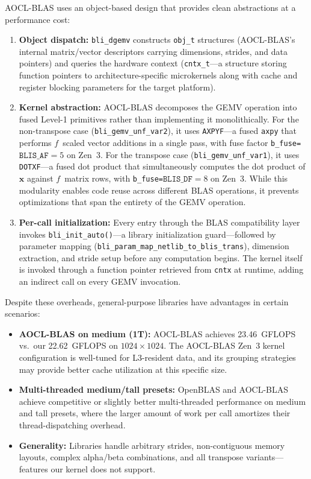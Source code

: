 \documentclass[runningheads]{llncs}
\begin{document}
\label{sec:blis}
AOCL-BLAS uses an object-based design that provides clean abstractions at a
performance cost:

\begin{enumerate}
\item \textbf{Object dispatch:} \texttt{bli\_dgemv} constructs \texttt{obj\_t}
      structures (AOCL-BLAS's internal matrix/vector descriptors carrying dimensions,
      strides, and data pointers) and queries the hardware context
      (\texttt{cntx\_t}---a structure storing function pointers to
      architecture-specific microkernels along with cache and register blocking
      parameters for the target platform).
\item \textbf{Kernel abstraction:} AOCL-BLAS decomposes the GEMV operation into
      fused Level-1 primitives rather than implementing it monolithically.
      For the non-transpose case (\texttt{bli\_gemv\_unf\_var2}), it uses
      \texttt{AXPYF}---a fused \texttt{axpy} that performs $f$~scaled
      vector additions in a single pass, with fuse factor
      \texttt{b\_fuse=}$\texttt{BLIS\_AF}=5$ on Zen~3.
      For the transpose case (\texttt{bli\_gemv\_unf\_var1}), it uses
      \texttt{DOTXF}---a fused dot product that simultaneously computes
      the dot product of $\mathbf{x}$ against $f$~matrix rows, with
      \texttt{b\_fuse=}$\texttt{BLIS\_DF}=8$ on Zen~3.
      While this modularity enables code reuse across different BLAS operations,
      it prevents optimizations that span the entirety of the GEMV operation.
\item \textbf{Per-call initialization:} Every entry through the BLAS
      compatibility layer invokes \texttt{bli\_init\_auto()}---a library
      initialization guard---followed by parameter mapping
      (\texttt{bli\_param\_map\_netlib\_to\_blis\_trans}), dimension
      extraction, and stride setup before any computation begins. The
      kernel itself is invoked through a function pointer retrieved from
      \texttt{cntx} at runtime, adding an indirect call on every GEMV
      invocation.
\end{enumerate}

Despite these overheads, general-purpose libraries have advantages in certain
scenarios:

\begin{itemize}
\item \textbf{AOCL-BLAS on medium (1T):} AOCL-BLAS achieves 23.46~GFLOPS vs.\ our
      22.62~GFLOPS on $1024 \times 1024$. The AOCL-BLAS Zen~3 kernel configuration
      is well-tuned for L3-resident data, and its grouping strategies
      may provide better cache utilization at this specific size.
\item \textbf{Multi-threaded medium/tall presets:} OpenBLAS and AOCL-BLAS achieve
      competitive or slightly better multi-threaded performance on medium and
      tall presets, where the larger amount of work per call amortizes their
      thread-dispatching overhead.
\item \textbf{Generality:} Libraries handle arbitrary strides, non-contiguous
      memory layouts, complex alpha/beta combinations, and all transpose
      variants---features our kernel does not support.
\end{itemize}
\end{document}
